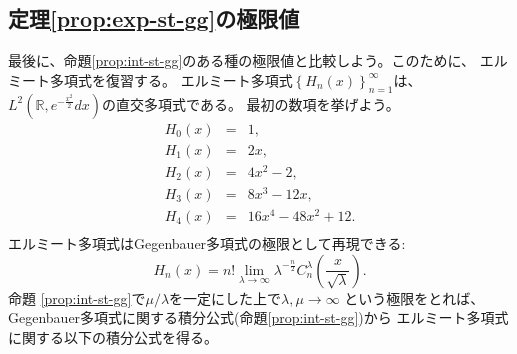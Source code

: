 \subsection{定理\ref{prop:exp-st-gg}の極限値}
最後に、命題\ref{prop:int-st-gg}のある種の極限値と比較しよう。このために、
エルミート多項式を復習する。
エルミート多項式$\left\{ H_n(x) \right\}_{n=1}^\infty$は、
	$L^2\left( \mathbb{R},e^{-\frac{x^2}{2}}dx \right)$の直交多項式である。
	最初の数項を挙げよう。
		\begin{eqnarray*}
		H_0(x)&=& 1,\\
		H_1(x)&=& 2x,\\
		H_2(x)&=& 
		4x^2-2,\\
		H_3(x)&=& 8x^3-12x,\\
		H_4(x)&=& 16x^4-48x^2+12.\\
		\end{eqnarray*}
	エルミート多項式はGegenbauer多項式の極限として再現できる:
	\begin{equation*}
			H_n (x) = n! \lim_{\lambda \rightarrow \infty} \lambda^{- \frac{n}{2}}
			C_n^{\lambda} \left( \frac{x}{\sqrt{\lambda}} \right).
	\end{equation*}
	命題 \ref{prop:int-st-gg}で$\mu/\lambda$を一定にした上で$\lambda,\mu\to\infty$ 
	という極限をとれば、Gegenbauer多項式に関する積分公式(命題\ref{prop:int-st-gg})から
	エルミート多項式に関する以下の積分公式を得る。
